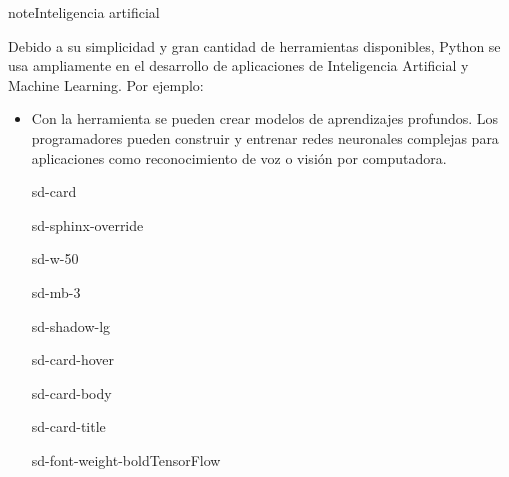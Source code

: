 \documentclass[letterpaper,10pt,spanish]{sphinxmanual}
\begin{document}
\begin{sphinxadmonition}{note}{Inteligencia artificial}

\sphinxAtStartPar
Debido a su simplicidad y gran cantidad de herramientas disponibles, Python se usa ampliamente en el desarrollo de aplicaciones de Inteligencia Artificial y Machine Learning. Por ejemplo:
\begin{itemize}
\item {} 
\sphinxAtStartPar
Con la herramienta  se pueden crear modelos de aprendizajes profundos. Los programadores pueden construir y entrenar redes neuronales complejas para aplicaciones como reconocimiento de voz o visión por computadora.

\begin{sphinxuseclass}{sd-card}
\begin{sphinxuseclass}{sd-sphinx-override}
\begin{sphinxuseclass}{sd-w-50}
\begin{sphinxuseclass}{sd-mb-3}
\begin{sphinxuseclass}{sd-shadow-lg}
\begin{sphinxuseclass}{sd-card-hover}
\begin{sphinxuseclass}{sd-card-body}
\begin{sphinxuseclass}{sd-card-title}
\begin{sphinxuseclass}{sd-font-weight-bold}TensorFlow
\end{sphinxuseclass}
\end{sphinxuseclass}
\end{sphinxuseclass}
\noindent{}
\end{sphinxuseclass}
\end{sphinxuseclass}
\end{sphinxuseclass}
\end{sphinxuseclass}
\end{sphinxuseclass}
\end{sphinxuseclass}
\end{itemize}
\end{sphinxadmonition}
\end{document}
